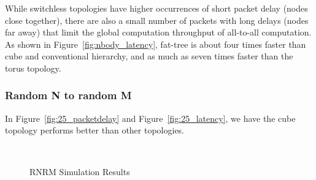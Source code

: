 While switchless topologies have higher occurrences of short packet delay (nodes close together), there are also a small number of packets with long delays (nodes far away) that limit the global computation throughput of all-to-all computation. As shown in Figure~\ref{fig:nbody_latency}, fat-tree is about four times faster than cube and conventional hierarchy, and as much as seven times faster than the torus topology.


\subsubsection{Random N to random M}
In Figure~\ref{fig:25_packetdelay} and Figure~\ref{fig:25_latency}, we have the cube topology performs better than other topologies.

\captionsetup[subfloat]{captionskip=-0.003in}
\begin{figure}
    \centering
    \\
    \vspace{-0.1in}
    \vspace{-0.07in}
    \caption{RNRM Simulation Results}
    \vspace{-0.1in}
\end{figure}


